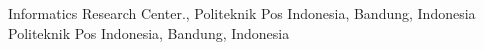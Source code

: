  Informatics Research Center., Politeknik Pos Indonesia, Bandung,
Indonesia
 Politeknik Pos Indonesia, Bandung,
Indonesia

